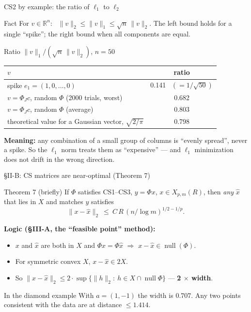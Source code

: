\documentclass[aspectratio=169,11pt]{beamer}
\newcommand{\norm}[1]{\lVert #1\rVert}
\begin{document}
\begin{frame}{CS2 by example: the ratio of $\ell_1$ to $\ell_2$}
  \begin{block}{Fact}
    For $v\in\mathbb{R}^n$: \ $\norm{v}_2\le\norm{v}_1\le\sqrt n\,\norm{v}_2$.
    The left bound holds for a single ``spike''; the right bound when all components are equal.
  \end{block}
  \begin{exampleblock}{Ratio $\norm{v}_1/(\sqrt n\,\norm{v}_2)$, $n=50$}
    \centering
    \begin{tabular}{@{}lc@{}}
      \toprule
      $v$ & ratio \\
      \midrule
      spike $e_1=(1,0,\dots,0)$ & 0.141 \ $(=1/\sqrt{50})$ \\
      $v=\Phi_Jc$, random $\Phi$ (2000 trials, worst) & 0.682 \\
      $v=\Phi_Jc$, random $\Phi$ (average) & 0.803 \\
      theoretical value for a Gaussian vector, $\sqrt{2/\pi}$ & 0.798 \\
      \bottomrule
    \end{tabular}
  \end{exampleblock}
  \textbf{Meaning:} any combination of a small group of columns is ``evenly spread'', never a spike.
  So the $\ell_1$ norm treats them as ``expensive'' --- and $\ell_1$ minimization does not drift in the wrong direction.
\end{frame}

\begin{frame}{\S II-B: CS matrices are near-optimal (Theorem 7)}
  \begin{block}{Theorem 7 (briefly)}
    If $\Phi$ satisfies CS1--CS3, $y=\Phi x$, $x\in X_{p,m}(R)$, then \emph{any} $\hat x$ that lies in $X$ and matches $y$ satisfies
    \[ \norm{x-\hat x}_2\ \le\ C\,R\,(n/\log m)^{1/2-1/p}. \]
  \end{block}
  \textbf{Logic (\S III-A, the ``feasible point'' method):}
  \begin{itemize}
    \item $x$ and $\hat x$ are both in $X$ and $\Phi x=\Phi\hat x$ $\Rightarrow$ $x-\hat x\in\operatorname{null}(\Phi)$.
    \item For symmetric convex $X$, $x-\hat x\in2X$.
    \item So $\norm{x-\hat x}_2\le2\cdot\sup\{\norm{h}_2:\ h\in X\cap\operatorname{null}\Phi\}$ --- \textbf{2 $\times$ width}.
  \end{itemize}
  \begin{exampleblock}{In the diamond example}
    With $a=(1,-1)$ the width is $0.707$. Any two points consistent with the data are at distance $\le1.414$.
  \end{exampleblock}
\end{frame}
\end{document}
